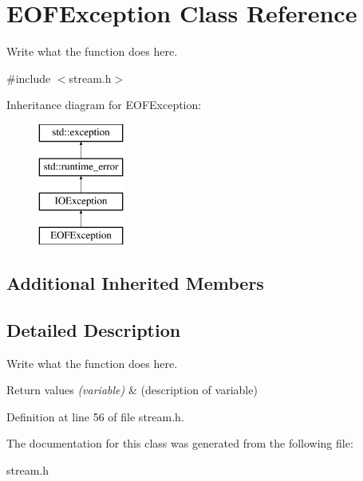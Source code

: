 \hypertarget{classEOFException}{\section{E\+O\+F\+Exception Class Reference}
\label{classEOFException}
}


Write what the function does here.  




{\ttfamily \#include $<$stream.\+h$>$}

Inheritance diagram for E\+O\+F\+Exception\+:\begin{figure}[H]
\begin{center}
\leavevmode
\includegraphics[height=4.000000cm]{classEOFException}
\end{center}
\end{figure}
\subsection*{Additional Inherited Members}


\subsection{Detailed Description}
Write what the function does here. 


\begin{DoxyRetVals}{Return values}
{\em (variable)} & (description of variable) \\
\hline
\end{DoxyRetVals}


Definition at line 56 of file stream.\+h.



The documentation for this class was generated from the following file\+:\begin{DoxyCompactItemize}
\item 
stream.\+h\end{DoxyCompactItemize}
